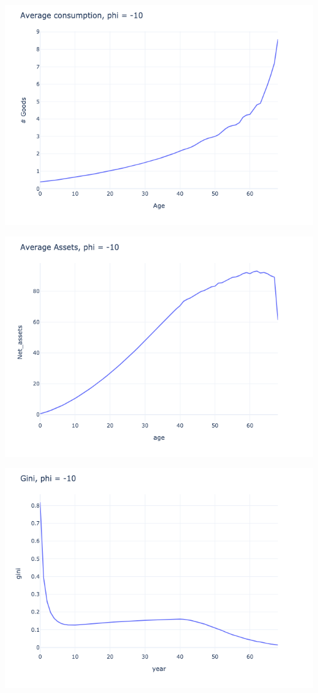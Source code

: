 \begin{questions}
\begin{solution}
\includegraphics[scale=0.5]{figures/consumption_-10_tax_15.png}

\includegraphics[scale=0.5]{figures/avg_assets_-10_tax_15.png}

\includegraphics[scale=0.5]{figures/gini_-10_tax_15.png}


\end{solution}
\end{questions}

